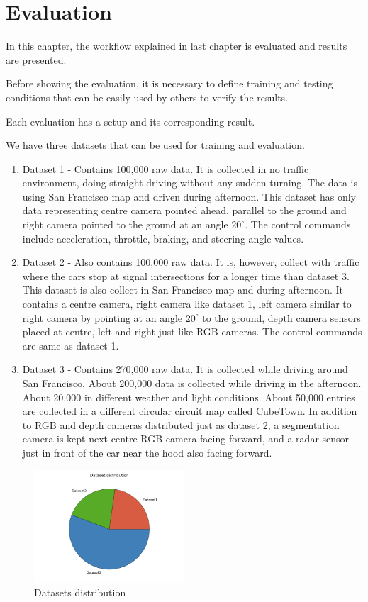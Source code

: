 \chapter{Evaluation}
In this chapter, the workflow explained in last chapter is evaluated and results are
presented.

Before showing the evaluation, it is necessary to define training and testing conditions
that can be easily used by others to verify the results.

Each evaluation has a setup and its corresponding result.

We have three datasets that can be used for training and evaluation.
\begin{enumerate}
    \item Dataset 1 - Contains 100,000 raw data. It is collected in no traffic
        environment, doing straight driving without any sudden turning. The data is using
        San Francisco map and driven during afternoon. This dataset has only data
        representing centre camera pointed ahead, parallel to the ground and right camera
        pointed to the ground at an angle $20^{\circ}$. The control commands include
        acceleration, throttle, braking, and steering angle values.
    \item Dataset 2 - Also contains 100,000 raw data. It is, however, collect with traffic
        where the cars stop at signal intersections for a longer time than dataset 3. This
        dataset is also collect in San Francisco map and during afternoon. It contains a
        centre camera, right camera like dataset 1, left camera similar to right camera by
        pointing at an angle $20^{\circ}$ to the ground, depth camera sensors placed at
        centre, left and right just like RGB cameras. The control commands are same as
        dataset 1.
    \item Dataset 3 - Contains 270,000 raw data. It is collected while driving around San
        Francisco. About 200,000 data is collected while driving in the afternoon. About
        20,000 in different weather and light conditions. About 50,000 entries are
        collected in a different circular circuit map called CubeTown. In addition to RGB
        and depth cameras distributed just as dataset 2, a segmentation camera is kept
        next centre RGB camera facing forward, and a radar sensor just in front of the
        car near the hood also facing forward.

\end{enumerate}
\begin{figure}
    \centering
    \includegraphics[width=0.5\textwidth]{figures/png/datasets_general.png}
    \caption{Datasets distribution}
    \label{fig:datasetsdistribution}
\end{figure}

